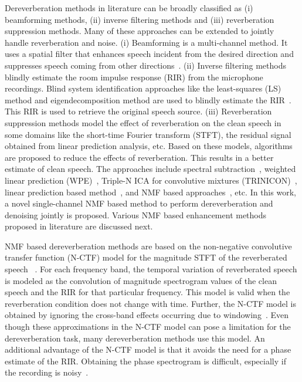 Dereverberation methods in literature can be broadly classified as (i) beamforming methods, (ii) inverse filtering methods and (iii) reverberation suppression methods. Many of these approaches can be extended to jointly handle reverberation and noise. (i) Beamforming is a multi-channel method. It uses a spatial filter that enhances speech incident from the desired direction and suppresses speech coming from other directions~\cite{gannot2017consolidated}. 
(ii) Inverse filtering methods blindly estimate the room impulse response (RIR) from the microphone recordings. Blind system identification approaches like the least-squares (LS) method and eigendecomposition method are used to blindly estimate the RIR~\cite{naylor2010speech}. This RIR is used to retrieve the original speech source. (iii) Reverberation suppression methods model the effect of reverberation on the clean speech in some domains like the short-time Fourier transform (STFT), the residual signal obtained from linear prediction analysis, etc. Based on these models, algorithms are proposed to reduce the effects of reverberation. This results in a better estimate of clean speech. The approaches include spectral subtraction~\cite{lebart2001new}, weighted linear prediction (WPE)~\cite{nakatani2010speech}, Triple-N ICA for convolutive mixtures (TRINICON)~\cite{buchner2007trinicon}, linear prediction based method~\cite{naylor2010speech}, and NMF based approaches~\cite{kameoka2009robust}, etc. In this work, a novel single-channel NMF based method to perform dereverberation and denoising jointly is proposed. Various NMF based enhancement methods proposed in literature are discussed next. 

NMF based dereverberation methods are based on the non-negative convolutive transfer function (N-CTF) model for the magnitude STFT of the reverberated speech ~\cite{kameoka2009robust,mohammadiha2016speech, Mohammadiha2015, Kumar2011}. For each frequency band, the temporal variation of reverberated speech is modeled as the convolution of magnitude spectrogram values of the clean speech and the RIR for that particular frequency. This model is valid when the reverberation condition does not change with time. Further, the N-CTF model is obtained by ignoring the cross-band effects occurring due to windowing~\cite{avargel2007system}.  Even though these approximations in the N-CTF model can pose a limitation for the dereverberation task, many dereverberation methods use this model. An additional advantage of the N-CTF model is that it avoids the need for a phase estimate of the RIR. Obtaining the phase spectrogram is difficult, especially if the recording is noisy~\cite{kameoka2009robust}. 

